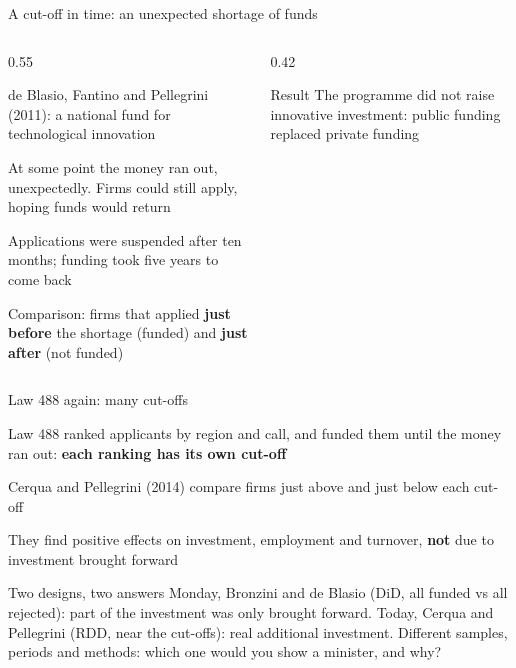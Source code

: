 \documentclass[aspectratio=169,xcolor=table]{beamer}
\begin{document}
\begin{frame}{A cut-off in time: an unexpected shortage of funds}
\small
\begin{columns}[T]
\begin{column}{0.55\textwidth}
\bi
  \item de Blasio, Fantino and Pellegrini (2011): a national fund for technological innovation
  \item At some point the money ran out, unexpectedly. Firms could still apply, hoping funds would return
  \item Applications were suspended after ten months; funding took five years to come back
  \item Comparison: firms that applied \textbf{just before} the shortage (funded) and \textbf{just after} (not funded)
\ei
\end{column}
\begin{column}{0.42\textwidth}
\begin{block}{Result}
The programme did not raise innovative investment: public funding replaced private funding
\end{block}
\end{column}
\end{columns}
\end{frame}

\begin{frame}{Law 488 again: many cut-offs}
\small
\bi
  \item Law 488 ranked applicants by region and call, and funded them until the money ran out: \textbf{each ranking has its own cut-off}
  \item Cerqua and Pellegrini (2014) compare firms just above and just below each cut-off
  \item They find positive effects on investment, employment and turnover, \textbf{not} due to investment brought forward
\ei
\vspace{0.1cm}
\begin{alertblock}{Two designs, two answers}
Monday, Bronzini and de Blasio (DiD, all funded vs all rejected): part of the investment was only brought forward. Today, Cerqua and Pellegrini (RDD, near the cut-offs): real additional investment. Different samples, periods and methods: which one would you show a minister, and why?
\end{alertblock}
\end{frame}
\end{document}
